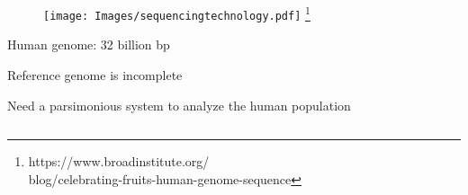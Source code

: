 \documentclass[10pt,dvipsnames,table]{beamer}
\begin{document}
\begin{frame}
\begin{columns}[t]
\begin{column}{0.4\textwidth}
\begin{center}
\begin{figure}[t]
\texttt{[image: Images/sequencingtechnology.pdf]} \footnote{\tiny{https://www.broadinstitute.org/ \\blog/celebrating-fruits-human-genome-sequence}}
\end{figure}
\end{center}

\begin{itemize}
{\small{
\item Human genome: 32 billion bp

\item Reference genome is incomplete
 
\item Need a parsimonious system to analyze the human population
}}
\end{itemize}
\end{column}

\end{columns}
\note{}
\end{frame}
\end{document}
